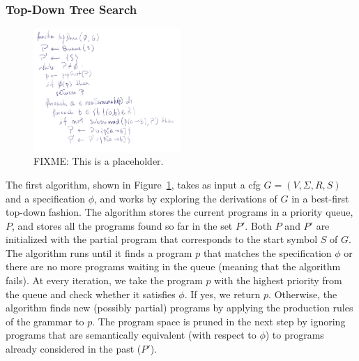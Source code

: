 \subsubsection{Top-Down Tree Search}
\label{sec:top-down-tree-search}

\begin{figure}
  \centering
  \includegraphics[width=0.5\textwidth]{assets/enum-top-down.png}
  \caption{FIXME: This is a placeholder.}
  \label{fig:enum-top-down}
\end{figure}

The first algorithm, shown in Figure~\ref{fig:enum-top-down}, takes as input a
\gls{cfg} $G = (V, \Sigma{}, R, S)$ and a specification $\phi{}$, and works by
exploring the derivations of $G$ in a best-first top-down fashion. The algorithm
stores the current programs in a priority queue, $P$, and stores all the
programs found so far in the set $P'$. Both $P$ and $P'$ are initialized with
the partial program that corresponds to the start symbol $S$ of $G$. The
algorithm runs until it finds a program $p$ that matches the specification
$\phi{}$ or there are no more programs waiting in the queue (meaning that the
algorithm fails). At every iteration, we take the program $p$ with the highest
priority from the queue and check whether it satisfies $\phi{}$. If yes, we
return $p$. Otherwise, the algorithm finds new (possibly partial) programs by
applying the production rules of the grammar to $p$. The program space is pruned
in the next step by ignoring programs that are semantically equivalent (with
respect to $\phi{}$) to programs already considered in the past ($P'$).



